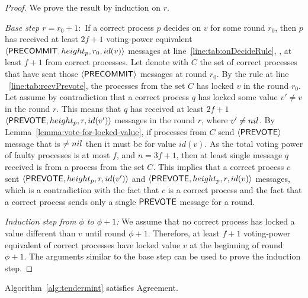 \begin{proof}
We prove the result by induction on $r$.

\emph{Base step $r = r_0 + 1:$} If a correct process $p$ decides on $v$ for some round $r_0$, then $p$ has received at least
$2f+1$ voting-power equivalent $\langle\mathsf{PRECOMMIT},height_p,r_0,id(v)\rangle$ messages at line~\ref{line:tab:onDecideRule}, \ie, at least $f+1$ from correct processes. Let denote with $C$ the set of correct processes that have sent those $\langle\mathsf{PRECOMMIT}\rangle$ messages at round $r_0$. By the rule at line ~\ref{line:tab:recvPrevote}, the processes from the set $C$ has locked $v$ in the round $r_0$. 
Let assume by contradiction that a correct process $q$ has locked some value $v' \neq v$ in the round $r$. This means that $q$ has received at least $2f+1$ $\langle\mathsf{PREVOTE},height_p, r,id(v')\rangle$ messages in the round $r$, where $v' \neq nil$. By Lemma~\ref{lemma:vote-for-locked-value}, if processes from $C$ send $\langle\mathsf{PREVOTE}\rangle$ message that is $\neq nil$ then it must be for value $id(v)$. As the total voting power of faulty processes is at most $f$, and $n=3f+1$, then at least single message $q$ received is from a process from the set $C$. This implies that a correct process $c$ sent $\langle\mathsf{PREVOTE},height_p, r,id(v')\rangle$ and $\langle\mathsf{PREVOTE},height_p, r,id(v)\rangle$ messages, which is a contradiction with the fact that $c$ is a correct process and the fact that a correct process sends only a single $\mathsf{PREVOTE}$ message for a round. 

\emph{Induction step from $\phi$ to $\phi+1$:}
We assume that no correct process has locked a value different than $v$ until round $\phi+1$. Therefore, at least $f+1$ voting-power equivalent of correct processes have locked value $v$ at the beginning of round $\phi+1$. The arguments similar to the base step can be used to prove the induction step.
\end{proof}

\begin{lemma}
	\label{lemma:agreement}
	Algorithm~\ref{alg:tendermint} satisfies Agreement. 
\end{lemma}

